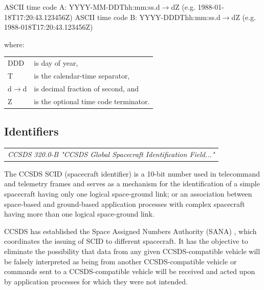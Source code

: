 ASCII time code A: YYYY-MM-DDThh:mm:ss.d$\rightarrow$dZ (e.g. 1988-01-18T17:20:43.123456Z)
ASCII time code B: YYYY-DDDThh:mm:ss.d$\rightarrow$dZ (e.g. 1988-018T17:20:43.123456Z)

where:

\begin{tabular}{l l}
DDD & is day of year, \\
T & is the calendar-time separator, \\
d$\rightarrow$d & is decimal fraction of second, and \\
Z & is the optional time code terminator.
\end{tabular}
 
\subsection{Identifiers}

\begin{tabular}{l}
\textit{CCSDS 320.0-B "CCSDS Global Spacecraft Identification Field..." \cite{CCSDS-320.0-B}} \\
\end{tabular}

The CCSDS SCID (spacecraft identifier) is a 10-bit number used in telecommand and telemetry frames and serves as a mechanism for the identification of a simple spacecraft having only one logical space-ground link; or an association between space-based and ground-based application processes with complex spacecraft having more than one logical space-ground link.

CCSDS has established the Space Assigned Numbers Authority (SANA) \cite{sanaregistry.org}, which coordinates the issuing of SCID to different spacecraft. It has the objective to eliminate the possibility that data from any given CCSDS-compatible vehicle will be falsely interpreted as being from another CCSDS-compatible vehicle or commands sent to a CCSDS-compatible vehicle will be received and acted upon by application processes for which they were not intended.
